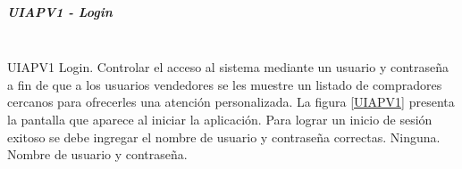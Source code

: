 \subparagraph{UIAPV1 - Login} ~\\

{UIAPV1} %
{Login.}  %
{Controlar el acceso al sistema mediante un usuario y contraseña a fin de que a los usuarios vendedores se les muestre un listado de compradores cercanos para ofrecerles una atención personalizada.} %
{La figura \ref{UIAPV1} presenta la pantalla que aparece al iniciar la aplicación. Para lograr un inicio de sesión exitoso se debe ingregar el nombre de usuario y contraseña correctas.} %
{Ninguna.} %
{Nombre de usuario y contraseña.} %






